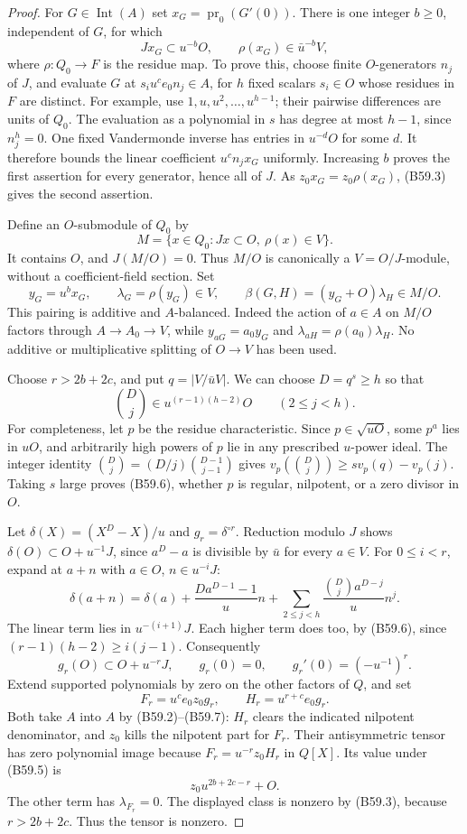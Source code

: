 \begin{proof}
For $G\in\operatorname{Int}(A)$ set
$x_G=\operatorname{pr}_0(G'(0))$. There is one
integer $b\ge0$, independent of $G$, for which
\[
             Jx_G\subset u^{-b}O,\qquad
             \rho(x_G)\in\bar u^{-b}V,                   \tag{B59.4}
\]
where $\rho:Q_0\to F$ is the residue map.
To prove this, choose finite $O$-generators $n_j$
of $J$, and evaluate $G$ at
$s_i u^ce_0n_j\in A$, for $h$ fixed scalars
$s_i\in O$ whose residues in $F$ are distinct.
For example, use $1,u,u^2,\ldots,u^{h-1}$;
their pairwise differences are units of $Q_0$.
The evaluation as a polynomial in $s$ has degree
at most $h-1$, since $n_j^h=0$. One fixed
Vandermonde inverse has entries in $u^{-d}O$
for some $d$. It therefore bounds the linear
coefficient $u^cn_jx_G$ uniformly. Increasing
$b$ proves the first assertion for every generator,
hence all of $J$. As $z_0x_G=z_0\rho(x_G)$,
(B59.3) gives the second assertion.

Define an $O$-submodule of $Q_0$ by
\[
 M=\{x\in Q_0:Jx\subset O,\ \rho(x)\in V\}.
\]
It contains $O$, and $J(M/O)=0$. Thus $M/O$
is canonically a $V=O/J$-module, without a
coefficient-field section. Set
\[
 y_G=u^b x_G,\qquad \lambda_G=\rho(y_G)\in V,
 \qquad \beta(G,H)=(y_G+O)\lambda_H\in M/O.               \tag{B59.5}
\]
This pairing is additive and $A$-balanced. Indeed
the action of $a\in A$ on $M/O$ factors through
$A\to A_0\to V$, while
$y_{aG}=a_0y_G$ and $\lambda_{aH}=\rho(a_0)\lambda_H$.
No additive or multiplicative splitting of $O\to V$
has been used.

Choose $r>2b+2c$, and put $q=|V/\bar uV|$.
We can choose $D=q^s\ge h$ so that
\[
 \binom Dj\in u^{(r-1)(h-2)}O\qquad(2\le j<h).           \tag{B59.6}
\]
For completeness, let $p$ be the residue
characteristic. Since $p\in\sqrt{uO}$, some
$p^a$ lies in $uO$, and arbitrarily high powers
of $p$ lie in any prescribed $u$-power ideal.
The integer identity
$\binom Dj=(D/j)\binom{D-1}{j-1}$ gives
$v_p(\binom Dj)\ge s v_p(q)-v_p(j)$.
Taking $s$ large proves (B59.6), whether $p$
is regular, nilpotent, or a zero divisor in $O$.

Let $\delta(X)=(X^D-X)/u$ and
$g_r=\delta^{\circ r}$. Reduction modulo $J$
shows $\delta(O)\subset O+u^{-1}J$, since
$a^D-a$ is divisible by $\bar u$ for every
$a\in V$. For $0\le i<r$, expand at
$a+n$ with $a\in O$, $n\in u^{-i}J$:
\[
 \delta(a+n)=\delta(a)+\frac{Da^{D-1}-1}{u}n
       +\sum_{2\le j<h}\frac{\binom Dj a^{D-j}}u n^j.
\]
The linear term lies in $u^{-(i+1)}J$.
Each higher term does too, by (B59.6), since
$(r-1)(h-2)\ge i(j-1)$. Consequently
\[
 g_r(O)\subset O+u^{-r}J,\qquad
 g_r(0)=0,\qquad g_r'(0)=(-u^{-1})^r.                    \tag{B59.7}
\]
Extend supported polynomials by zero on the other
factors of $Q$, and set
\[
                    F_r=u^ce_0z_0g_r,\qquad
                    H_r=u^{r+c}e_0g_r.
\]
Both take $A$ into $A$ by (B59.2)--(B59.7):
$H_r$ clears the indicated nilpotent denominator,
and $z_0$ kills the nilpotent part for $F_r$.
Their antisymmetric tensor has zero polynomial
image because $F_r=u^{-r}z_0H_r$ in $Q[X]$.
Its value under (B59.5) is
\[
                              z_0u^{2b+2c-r}+O.           \tag{B59.8}
\]
The other term has $\lambda_{F_r}=0$. The displayed
class is nonzero by (B59.3), because
$r>2b+2c$. Thus the tensor is nonzero.


\end{proof}
